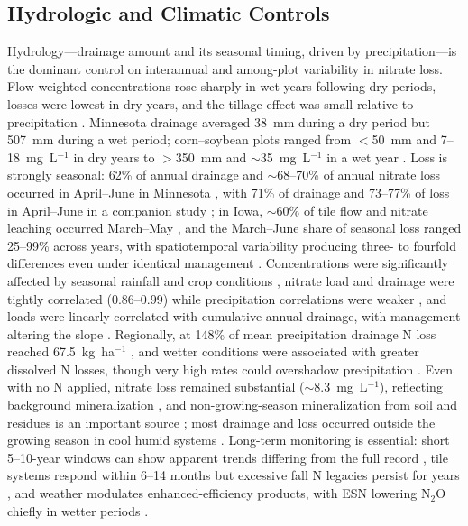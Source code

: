 \documentclass[11pt]{article}
\begin{document}
\subsection{Hydrologic and Climatic Controls}

Hydrology---drainage amount and its seasonal timing, driven by precipitation---is the dominant control on interannual and among-plot variability in nitrate loss. Flow-weighted concentrations rose sharply in wet years following dry periods, losses were lowest in dry years, and the tillage effect was small relative to precipitation \parencite{RANDALL1995}. Minnesota drainage averaged 38~mm during a dry period but 507~mm during a wet period; corn--soybean plots ranged from $<$50~mm and 7--18~mg~L$^{-1}$ in dry years to $>$350~mm and $\sim$35~mg~L$^{-1}$ in a wet year \parencite{Randall2001}. Loss is strongly seasonal: 62\% of annual drainage and $\sim$68--70\% of annual nitrate loss occurred in April--June in Minnesota \parencite{Randall2003}, with 71\% of drainage and 73--77\% of loss in April--June in a companion study \parencite{Randall2005}; in Iowa, $\sim$60\% of tile flow and nitrate leaching occurred March--May \parencite{Bakhsh2007}, and the March--June share of seasonal loss ranged 25--99\% across years, with spatiotemporal variability producing three- to fourfold differences even under identical management \parencite{Bakhsh2010}. Concentrations were significantly affected by seasonal rainfall and crop conditions \parencite{Bakhsh2005}, nitrate load and drainage were tightly correlated (0.86--0.99) while precipitation correlations were weaker \parencite{Masri2024}, and loads were linearly correlated with cumulative annual drainage, with management altering the slope \parencite{OBrien2022}. Regionally, at 148\% of mean precipitation drainage N loss reached 67.5~kg~ha$^{-1}$ \parencite{Zhao2016}, and wetter conditions were associated with greater dissolved N losses, though very high rates could overshadow precipitation \parencite{Christianson2015b}. Even with no N applied, nitrate loss remained substantial ($\sim$8.3~mg~L$^{-1}$), reflecting background mineralization \parencite{Waring2022}, and non-growing-season mineralization from soil and residues is an important source \parencite{Gentry2024}; most drainage and loss occurred outside the growing season in cool humid systems \parencite{Gordon2005}. Long-term monitoring is essential: short 5--10-year windows can show apparent trends differing from the full record \parencite{Clifford2023}, tile systems respond within 6--14 months but excessive fall N legacies persist for years \parencite{Jaynes2015}, and weather modulates enhanced-efficiency products, with ESN lowering N$_2$O chiefly in wetter periods \parencite{Menegaz2025}.
\end{document}
